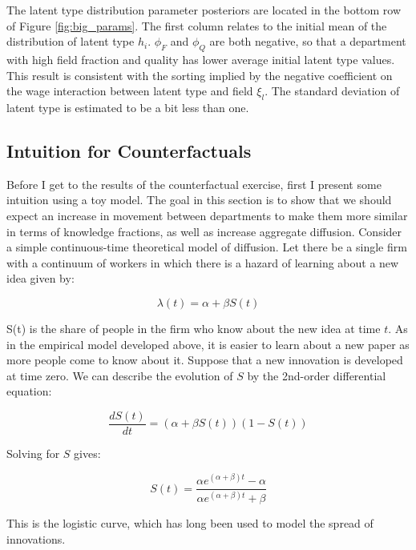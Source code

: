 The latent type distribution parameter posteriors are located in the bottom
row of Figure \ref{fig:big_params}. The first column relates to the initial
mean of the distribution of latent type $h_i$. $\phi_F$ and $\phi_Q$ are both negative, so that
a department with high field fraction and quality has lower average initial latent type values.  This result is consistent with
the sorting implied by the negative coefficient on the wage interaction between latent type and field $\xi_l$.
The standard deviation of latent type is estimated to be a bit less than one.

\subsection{Intuition for Counterfactuals}
\label{sec:count_int}

Before I get to the results of the counterfactual exercise, first I present some
intuition using a toy model.  The goal in this section is to show that we should expect
an increase in movement between departments to make them more similar in terms of knowledge fractions,
as well as increase aggregate diffusion.  Consider a simple continuous-time theoretical model of
diffusion. Let there be a single firm with a continuum of workers in
which there is a hazard of learning about a new idea given by:

\begin{equation}
    \lambda(t) = \alpha + \beta S(t)
\end{equation}

S(t) is the share of people in the firm who know about the new idea at
time $t$. As in the empirical model
developed above, it is easier to learn about a new paper as
more people come to know about it. Suppose that a new innovation is developed at time
zero. We can describe the evolution of $S$ by the 2nd-order differential
equation:

\begin{equation}
    \frac{dS(t)}{d t} = \left( \alpha + \beta S(t) \right) \left(1 - S(t)\right)
    \label{eq:difeq_orig}
\end{equation}

Solving for $S$ gives:

\begin{equation}
    S(t) = \frac{\alpha e^{\left(\alpha + \beta \right) t} - \alpha}{\alpha e^{\left(\alpha + \beta \right) t} + \beta}
    \label{eq:difeq}
\end{equation}

This is the logistic curve, which has long been used to model the spread
of innovations.

